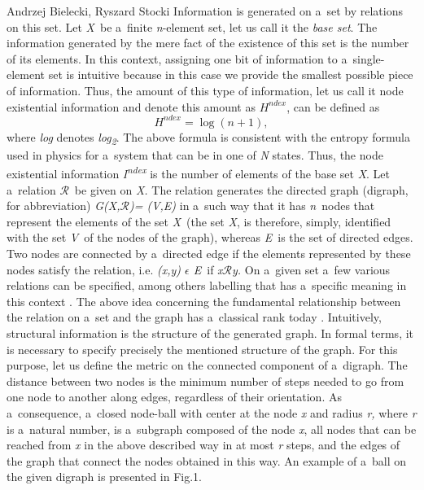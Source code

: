 \begin{artengenv2auth}{Andrzej Bielecki, Ryszard Stocki}
Information is generated on a~set by relations on this set. Let \textit{X}~be a~finite \textit{n}{}-element set, let us call it the \textit{base set}. The information generated by the mere fact of the existence of this set is the number of its elements. In this context, assigning one bit of information to a~single-element set is intuitive because in this case we provide the smallest possible piece of information. Thus, the amount of this type of information, let us call it node existential information
and denote this amount as
$H^{\textit{ndex}}$, can be defined as
\begingroup
\reqnos
\begin{equation}
H^{\textit{ndex}}=\log (n+1),
\end{equation}
\endgroup
where \textit{log} denotes \textit{log}\textit{\textsubscript{2}}. The above formula is consistent with the entropy formula used in physics for a~system that can be in one of \textit{N} states. Thus, the node existential information \textit{I}\textit{\textsuperscript{ndex}} is the number of elements of the base set \textit{X}. Let a~relation $\mathcal{R}$~be given on \textit{X.}  The relation generates the directed graph (digraph, for abbreviation) \textit{G(X,$\mathcal{R}$)= (V,E)} in a~such way that it has \textit{n}~nodes that represent the elements of the set \textit{X}~(the set \textit{X}, is therefore, simply, identified with the set \textit{V}~of the nodes of the graph), whereas \textit{E}~is the set of directed edges.  Two nodes are connected by a~directed edge if the elements represented by these nodes satisfy the relation, i.e. \textit{(x,y) $\epsilon $ E}~if \textit{x$\mathcal{R}$y.} On a~given set a~few various relations can be specified, among others labelling that has a~specific meaning in this context 
\parencite[for details see][]{bielecki_information_2022}. %
 The above idea concerning the fundamental relationship between the relation on a~set and the graph has a~classical rank today 
\parencite[][]{carnap_logische_1928}. %
 Intuitively, structural information is the structure of the generated graph. In formal terms, it is necessary to specify precisely the mentioned structure of the graph. For this purpose, let us define the metric on the connected component of a~digraph. The distance between two nodes is the minimum number of steps needed to go from one node to another along edges, regardless of their orientation. As a~consequence, a~closed node-ball with center at the node \textit{x} and radius \textit{r,} where \textit{r} is a~natural number, is a~subgraph composed of the node \textit{x}, all nodes that can be reached from \textit{x} in the above described way in at most \textit{r} steps, and the edges of the graph that connect the nodes obtained in this way. An example of a~ball on the given digraph is presented in Fig.1.



\end{artengenv2auth}
